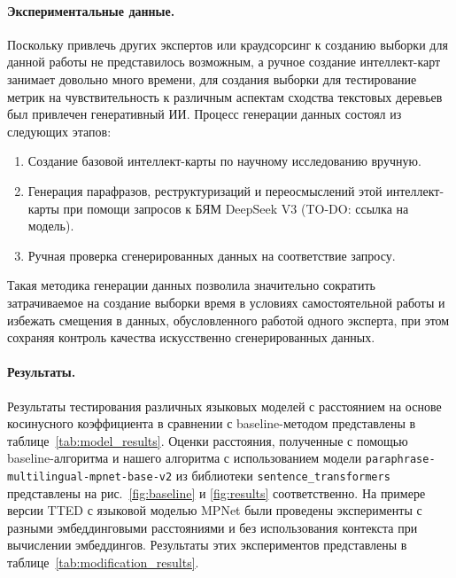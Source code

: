 \documentclass[12pt]{article}
\begin{document}
\paragraph{Экспериментальные данные.} Поскольку привлечь других экспертов или краудсорсинг к созданию выборки для данной работы не представилось возможным, а ручное создание интеллект-карт занимает довольно много времени, для создания выборки для тестирование метрик на чувствительность к различным аспектам сходства текстовых деревьев был привлечен генеративный ИИ. Процесс генерации данных состоял из следующих этапов:
\begin{enumerate}
    \item Создание базовой интеллект-карты по научному исследованию вручную.
    \item Генерация парафразов, реструктуризаций и переосмыслений этой интеллект-карты при помощи запросов к БЯМ DeepSeek V3 (TO-DO: ссылка на модель).
    \item Ручная проверка сгенерированных данных на соответствие запросу.
\end{enumerate}
Такая методика генерации данных позволила значительно сократить затрачиваемое на создание выборки время в условиях самостоятельной работы и избежать смещения в данных, обусловленного работой одного эксперта, при этом сохраняя контроль качества искусственно сгенерированных данных.

\paragraph{Результаты.} Результаты тестирования различных языковых моделей с расстоянием на основе косинусного коэффициента в сравнении с baseline-методом представлены в таблице~\ref{tab:model_results}. Оценки расстояния, полученные с помощью baseline-алгоритма и нашего алгоритма с использованием модели \texttt{paraphrase-multilingual-mpnet-base-v2} из библиотеки \texttt{sentence\_transformers} представлены на рис.~\ref{fig:baseline} и \ref{fig:results} соответственно. На примере версии TTED с языковой моделью MPNet были проведены эксперименты с разными эмбеддинговыми расстояниями и без использования контекста при вычислении эмбеддингов. Результаты этих экспериментов представлены в таблице~\ref{tab:modification_results}. 
\end{document}
